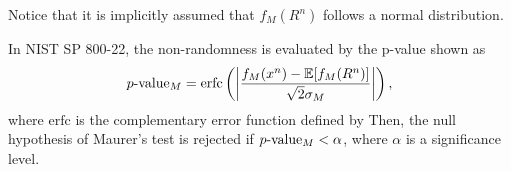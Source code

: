 Notice that it is implicitly assumed that $f_M(R^n)$ follows a normal distribution.
%
\par
In NIST SP 800-22, the non-randomness is evaluated by the p-value shown as
\begin{align}
	p\mathchar`- \mathrm{value}_M 
	= \mathrm{erfc} \left( \left| \frac{f_M(x^n) - \mathbb{E}[f_M(R^n)]}{\sqrt{2} \sigma_M} \right| \right),
\end{align}
where $\mathrm{erfc}$ is the complementary error function defined by
Then, the null hypothesis of Maurer's test is rejected if $p\mathchar`- \mathrm{value}_M < \alpha$, where $\alpha$ is a significance level.
%
